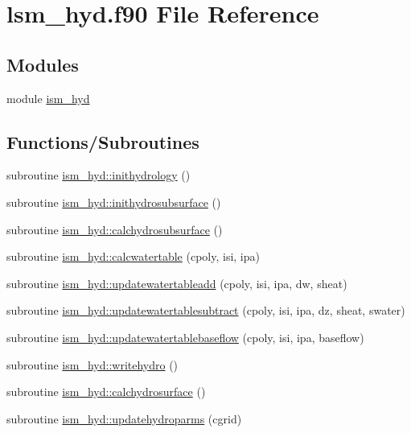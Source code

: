 \hypertarget{lsm__hyd_8f90}{}\section{lsm\+\_\+hyd.\+f90 File Reference}
\label{lsm__hyd_8f90}
\subsection*{Modules}
\begin{DoxyCompactItemize}
\item 
module \hyperlink{namespaceism__hyd}{ism\+\_\+hyd}
\end{DoxyCompactItemize}
\subsection*{Functions/\+Subroutines}
\begin{DoxyCompactItemize}
\item 
subroutine \hyperlink{namespaceism__hyd_a98b6f6b545573612779384a01c01c205}{ism\+\_\+hyd\+::inithydrology} ()
\item 
subroutine \hyperlink{namespaceism__hyd_acca2334ca5069950d6adef9eaae27d19}{ism\+\_\+hyd\+::inithydrosubsurface} ()
\item 
subroutine \hyperlink{namespaceism__hyd_abe60d473da0101c5d10199ec90a19709}{ism\+\_\+hyd\+::calchydrosubsurface} ()
\item 
subroutine \hyperlink{namespaceism__hyd_a1f3f735b62b6a5980c77edfd2e483872}{ism\+\_\+hyd\+::calcwatertable} (cpoly, isi, ipa)
\item 
subroutine \hyperlink{namespaceism__hyd_ae0c24c6f8e3542b5b5a803b05b30f139}{ism\+\_\+hyd\+::updatewatertableadd} (cpoly, isi, ipa, dw, sheat)
\item 
subroutine \hyperlink{namespaceism__hyd_a3cf0a5b96175f355174d5ea1a90c77cd}{ism\+\_\+hyd\+::updatewatertablesubtract} (cpoly, isi, ipa, dz, sheat, swater)
\item 
subroutine \hyperlink{namespaceism__hyd_aaa3a8833c906337c48deff2f1c66e4f1}{ism\+\_\+hyd\+::updatewatertablebaseflow} (cpoly, isi, ipa, baseflow)
\item 
subroutine \hyperlink{namespaceism__hyd_a4e8c7e70b444e7ff43a706456bced972}{ism\+\_\+hyd\+::writehydro} ()
\item 
subroutine \hyperlink{namespaceism__hyd_ad0a3a5f06f44a69ea7cc9dc0ec7dbd9b}{ism\+\_\+hyd\+::calchydrosurface} ()
\item 
subroutine \hyperlink{namespaceism__hyd_a4ca1546231047046881c8e9dc41b640f}{ism\+\_\+hyd\+::updatehydroparms} (cgrid)
\end{DoxyCompactItemize}
